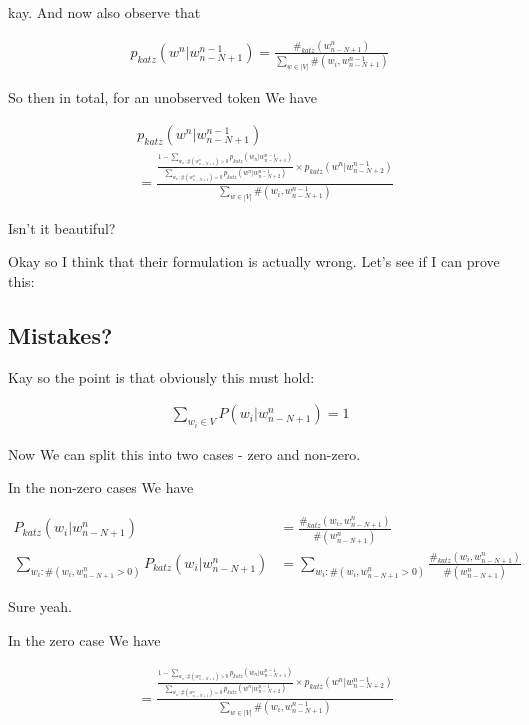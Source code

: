 \documentclass{article}
\begin{document}
		kay. And now also observe that
		
		\begin{align}
			p_{katz}(w^n|w^{n-1}_{n-N+1}) = \frac{\#_{katz}(w^n_{n-N+1})}{\sum_{w\in|V|} \#(w_i, w^{n-1}_{n-N+1})}
		\end{align}
		
		So then in total, for an unobserved token We have 
		
		\begin{align}
			&p_{katz}(w^n|w^{n-1}_{n-N+1}) \\
			&= \frac{\frac{1 - \sum_{w_n:\#(w^n_{n-N+1})>0} p_{katz}(w_n|w^{n-1}_{n-N+1})}{\sum_{w_n:\#(w^n_{n-N+1})=0} p_{katz}(w^n|w^{n-1}_{n-N+2})} \times p_{katz}(w^n|w^{n-1}_{n-N+2})}{\sum_{w\in|V|} \#(w_i, w^{n-1}_{n-N+1})}
		\end{align}
		
		Isn't it beautiful?
		
		Okay so I think that their formulation is actually wrong. Let's see if I can prove this:
		
	\subsection{Mistakes?}
		
		Kay so the point is that obviously this must hold:
		
		\begin{align}
			\sum_{w_i\in V} P(w_i|w^n_{n-N+1}) = 1
		\end{align}
		
		Now We can split this into two cases - zero and non-zero.
		
		In the non-zero cases We have
		
		\begin{align}
			P_{katz}(w_i|w^n_{n-N+1}) &= \frac{\#_{katz}(w_i, w^n_{n-N+1})}{\#(w^n_{n-N+1})}\\
			\sum_{w_i:\#(w_i, w^n_{n-N+1}>0)}P_{katz}(w_i|w^n_{n-N+1}) &= \sum_{w_i:\#(w_i, w^n_{n-N+1}>0)}\frac{\#_{katz}(w_i, w^n_{n-N+1})}{\#(w^n_{n-N+1})}
		\end{align}
		
		Sure yeah.
		
		In the zero case We have 
		
		\begin{align}
			&= \frac{\frac{1 - \sum_{w_n:\#(w^n_{n-N+1})>0} p_{katz}(w_n|w^{n-1}_{n-N+1})}{\sum_{w_n:\#(w^n_{n-N+1})=0} p_{katz}(w^n|w^{n-1}_{n-N+2})} \times p_{katz}(w^n|w^{n-1}_{n-N+2})}{\sum_{w\in|V|} \#(w_i, w^{n-1}_{n-N+1})}
		\end{align}
		
\end{document}
